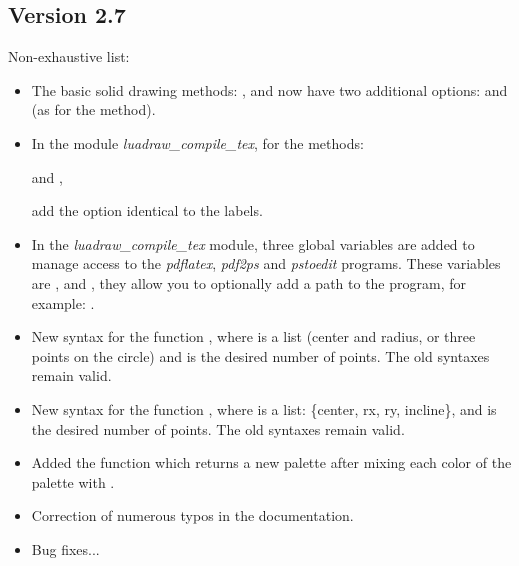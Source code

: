 \subsection{Version 2.7}
Non-exhaustive list:
\begin{itemize}
    \item The basic solid drawing methods: ,  and  now have two additional options:  and  (as for the  method).
    \item In the module \emph{luadraw\_compile\_tex}, for the methods: \par
    \hfil {} and ,\hfil\par
     add the option  identical to the labels.
    \item In the \emph{luadraw\_compile\_tex} module, three global variables are added to manage access to the \emph{pdflatex}, \emph{pdf2ps} and \emph{pstoedit} programs. These variables are ,  and , they allow you to optionally add a path to the program, for example: .
    \item New syntax for the function , where  is a list (center and radius, or three points on the circle) and  is the desired number of points. The old syntaxes remain valid.
    \item New syntax for the function , where  is a list: \{center, rx, ry, incline\}, and  is the desired number of points. The old syntaxes remain valid.
    \item Added the function  which returns a new palette after mixing each color of the palette  with .
    \item Correction of numerous typos in the documentation.
    \item Bug fixes...
\end{itemize}

